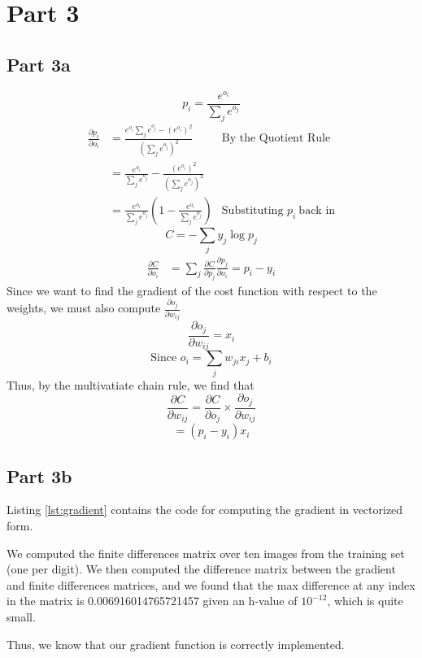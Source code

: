 \documentclass[10pt,letterpaper]{article}
\begin{document}
	\section{Part 3}
	\subsection*{Part 3a}
	\[p_i = \frac{e^{o_i}}{\sum_j e^{o_j}}\]
	\begin{align*}
	\frac{\partial p_i}{\partial o_i} &= \frac{e^{o_i}\sum_j e^{o_j} - (e^{o_i})^2}{(\sum_j e^{o_j})^2} & \text{By the Quotient Rule}\\
	&= \frac{e^{o_i}}{\sum_j e^{o_j}} - \frac{(e^{o_i})^2}{(\sum_j e^{o_j})^2}\\
	&= \frac{e^{o_i}}{\sum_j e^{o_j}}\left(1 - \frac{e^{o_i}}{\sum_j e^{o_j}}\right) & \text{Substituting } p_i\ \text{back in}
	\end{align*}
	\[C = -\sum_j y_j \log p_j\]
	\begin{align*}
	\frac{\partial C}{\partial o_i} &= \sum_j \frac{\partial C}{\partial p_j} \frac{\partial p_j}{\partial o_i} = p_i - y_i %
	\end{align*}
	Since we want to find the gradient of the cost function with respect to the weights, we must also compute \(\frac{\partial o_j}{\partial w_{ij}}\)
	\[\frac{\partial o_j}{\partial w_{ij}} = x_i\]
	\[\text{Since }o_i = \sum_j w_{ji} x_j + b_i\]
	Thus, by the multivatiate chain rule, we find that
	\[\frac{\partial C}{\partial w_{ij}} =\frac{\partial C}{\partial o_j} \times \frac{\partial o_j}{\partial w_{ij}}\]
	\[= (p_i - y_i)x_i\]
	\subsection*{Part 3b}
	Listing \ref{lst:gradient} contains the code for computing the gradient in vectorized form.

	We computed the finite differences matrix over ten images from the training set (one per digit).
	We then computed the difference matrix between the gradient and finite differences matrices, and we found that the max difference at any index in the matrix is 0.006916014765721457 given an h-value of $10^{-12}$, which is quite small.

	Thus, we know that our gradient function is correctly implemented.\\
\end{document}
